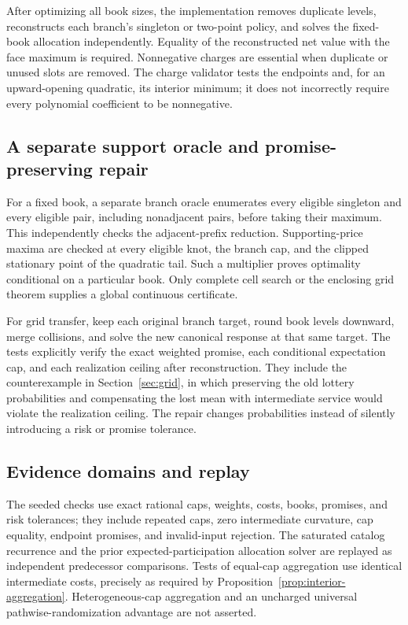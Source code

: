 After optimizing all book sizes, the implementation removes duplicate levels, reconstructs each branch's singleton or two-point policy, and solves the fixed-book allocation independently. Equality of the reconstructed net value with the face maximum is required. Nonnegative charges are essential when duplicate or unused slots are removed. The charge validator tests the endpoints and, for an upward-opening quadratic, its interior minimum; it does not incorrectly require every polynomial coefficient to be nonnegative.

\subsection{A separate support oracle and promise-preserving repair}
For a fixed book, a separate branch oracle enumerates every eligible singleton and every eligible pair, including nonadjacent pairs, before taking their maximum. This independently checks the adjacent-prefix reduction. Supporting-price maxima are checked at every eligible knot, the branch cap, and the clipped stationary point of the quadratic tail. Such a multiplier proves optimality conditional on a particular book. Only complete cell search or the enclosing grid theorem supplies a global continuous certificate.

For grid transfer, keep each original branch target, round book levels downward, merge collisions, and solve the new canonical response at that same target. The tests explicitly verify the exact weighted promise, each conditional expectation cap, and each realization ceiling after reconstruction. They include the counterexample in Section~\ref{sec:grid}, in which preserving the old lottery probabilities and compensating the lost mean with intermediate service would violate the realization ceiling. The repair changes probabilities instead of silently introducing a risk or promise tolerance.

\subsection{Evidence domains and replay}
The seeded checks use exact rational caps, weights, costs, books, promises, and risk tolerances; they include repeated caps, zero intermediate curvature, cap equality, endpoint promises, and invalid-input rejection. The saturated catalog recurrence and the prior expected-participation allocation solver are replayed as independent predecessor comparisons. Tests of equal-cap aggregation use identical intermediate costs, precisely as required by Proposition~\ref{prop:interior-aggregation}. Heterogeneous-cap aggregation and an uncharged universal pathwise-randomization advantage are not asserted.

